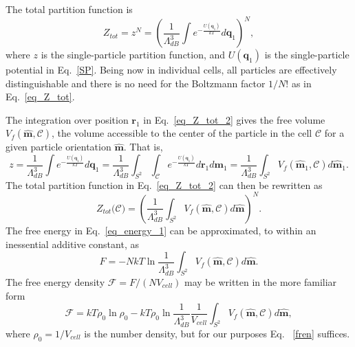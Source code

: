 \documentclass{article}
\begin{document}
The total partition function is 
\begin{equation}
Z_{tot}=z^{N}=\left( \frac{1}{\Lambda _{dB}^{3}}\int e^{-\frac{U(\mathbf{q}%
_{1})}{kT}}d\mathbf{q}_{1}\right) ^{N},  \label{eq_Z_tot_2}
\end{equation}%
where $z$ is the single-particle partition function, and $U(\mathbf{q}_{1})$
is the single-particle potential in Eq.~\eqref{SP}. Being now in individual
cells, all particles are effectively distinguishable and there is no need
for the Boltzmann factor $1/N!$ as in Eq.~\eqref{eq_Z_tot}.

The integration over position $\mathbf{r}_{1}$ in Eq.~\eqref{eq_Z_tot_2}
gives the free volume $V_{f}(\mathbf{\hat{m},}\mathcal{C})$, the volume
accessible to the center of the particle in the cell $\mathcal{C}$ for a
given particle orientation $\mathbf{\hat{m}}$. That is, 
\begin{equation}
z=\frac{1}{\Lambda _{dB}^{3}}\int e^{-\frac{U(\mathbf{q}_{1})}{kT}}d\mathbf{q%
}_{1}=\frac{1}{\Lambda _{dB}^{3}}\int_{S^{2}}\int_{\mathcal{C}}e^{-\frac{U(%
\mathbf{q}_{1})}{kT}}d\mathbf{r}_{1}d\mathbf{m}_{1}=\frac{1}{\Lambda
_{dB}^{3}}\int_{S^{2}}V_{f}(\mathbf{\hat{m}}_{1},\mathcal{C})d\mathbf{\hat{m}%
}_{1}.
\end{equation}
The total partition function in Eq.~\eqref{eq_Z_tot_2} can then be rewritten
as%
\begin{equation}
Z_{tot}(\mathcal{C)}=\left( \frac{1}{\Lambda _{dB}^{3}}\int_{S^{2}}V_{f}(%
\mathbf{\hat{m},}\mathcal{C})d\mathbf{\hat{m}}\right) ^{N}.
\label{eq_Z_tot_3}
\end{equation}%
The free energy in Eq.~\eqref{eq_energy_1} can be approximated, to within an
inessential additive constant, as 
\begin{equation}
F=-NkT\ln \frac{1}{\Lambda _{dB}^{3}}\int_{S^{2}}V_{f}(\mathbf{\hat{m},}%
\mathcal{C})d\mathbf{\hat{m}}.  \label{fren}
\end{equation}%
The free energy density $\mathcal{F}=F/(NV_{cell})$ may be written in the
more familiar form 
\begin{equation}
\mathcal{F}=kT\rho _{0}\ln \rho _{0}-kT\rho _{0}\ln \frac{1}{\Lambda
_{dB}^{3}}\frac{1}{V_{cell}}\int_{S^{2}}V_{f}(\mathbf{\hat{m}},\mathcal{C})d%
\mathbf{\hat{m}},
\end{equation}%
where $\rho _{0}=1/V_{cell}$ is the number density, but for our purposes Eq.~%
\eqref{fren} suffices.
\end{document}
